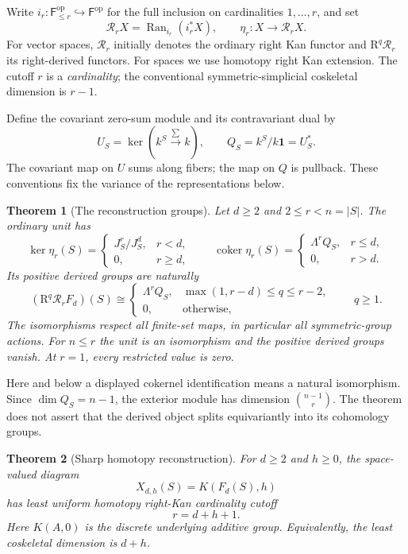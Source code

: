 \documentclass[11pt,a4paper]{article}
\newtheorem{theorem}{Theorem}[section]
\theoremstyle{definition}
\theoremstyle{remark}
\newcommand{\F}{\mathsf F}
\newcommand{\Rr}{\mathcal R_r}
\newcommand{\op}{\mathrm{op}}
\newcommand{\Ran}{\operatorname{Ran}}
\newcommand{\coker}{\operatorname{coker}}
\newcommand{\one}{\mathbf 1}
\begin{document}
Write $i_r:\F_{\le r}^{\op}\hookrightarrow\F^{\op}$ for the full inclusion on cardinalities $1,\ldots,r$, and set
\[
 \Rr X=\Ran_{i_r}(i_r^*X),\qquad
 \eta_r:X\longrightarrow\Rr X.
\]
For vector spaces, $\Rr$ initially denotes the ordinary right Kan functor and $\mathrm R^q\Rr$ its right-derived functors. For spaces we use homotopy right Kan extension. The cutoff $r$ is a \emph{cardinality}; the conventional symmetric-simplicial coskeletal dimension is $r-1$.

Define the covariant zero-sum module and its contravariant dual by
\[
 U_S=\ker(k^S\xrightarrow{\sum}k),\qquad
 Q_S=k^S/k\one=U_S^*.
\]
The covariant map on $U$ sums along fibers; the map on $Q$ is pullback. These conventions fix the variance of the representations below.

\begin{theorem}[The reconstruction groups]\label{thm:groups}
Let $d\ge2$ and $2\le r<n=|S|$. The ordinary unit has
\[
 \ker\eta_r(S)=
 \begin{cases}J_S^r/J_S^d,&r<d,\\0,&r\ge d,\end{cases}
 \qquad
 \coker\eta_r(S)=
 \begin{cases}\Lambda^r Q_S,&r\le d,\\0,&r>d.\end{cases}
\]
Its positive derived groups are naturally
\begin{equation}\label{eq:derived-strip}
 (\mathrm R^q\Rr F_d)(S)\cong
 \begin{cases}
 \Lambda^r Q_S,&\max(1,r-d)\le q\le r-2,\\
 0,&\text{otherwise},
 \end{cases}\qquad q\ge1.
\end{equation}
The isomorphisms respect all finite-set maps, in particular all symmetric-group actions. For $n\le r$ the unit is an isomorphism and the positive derived groups vanish. At $r=1$, every restricted value is zero.
\end{theorem}

Here and below a displayed cokernel identification means a natural isomorphism. Since $\dim Q_S=n-1$, the exterior module has dimension $\binom{n-1}{r}$. The theorem does not assert that the derived object splits equivariantly into its cohomology groups.

\begin{theorem}[Sharp homotopy reconstruction]\label{thm:sharp}
For $d\ge2$ and $h\ge0$, the space-valued diagram
\[
 X_{d,h}(S)=K(F_d(S),h)
\]
has least uniform homotopy right-Kan cardinality cutoff
\[
 \boxed{r=d+h+1.}
\]
Here $K(A,0)$ is the discrete underlying additive group. Equivalently, the least coskeletal dimension is $d+h$.
\end{theorem}
\end{document}
